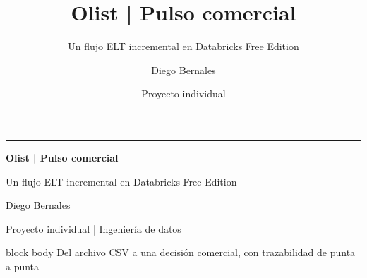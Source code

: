 \documentclass[aspectratio=169,10pt]{beamer}
\title{Olist | Pulso comercial}
\subtitle{Un flujo ELT incremental en Databricks Free Edition}
\author{Diego Bernales}
\date{Proyecto individual}
\begin{document}
\begingroup
{}
\begin{frame}[plain]
  \vspace*{1.1cm}
  \hspace*{1.2cm}\begin{minipage}{.78\textwidth}
    {\color{OlistTeal}\rule{1.4cm}{3pt}\par}
    \vspace{.4cm}
    {\color{OlistNavy}\LARGE\bfseries Olist | Pulso comercial\par}
    \vspace{.3cm}
    {\large Un flujo ELT incremental en Databricks Free Edition\par}
    \vspace{1.0cm}
    {\color{OlistGray}\large Diego Bernales\par}
    \vspace{.2cm}
    {\color{OlistGray}\small Proyecto individual | Ingeniería de datos\par}
    \vfill
    \begin{beamercolorbox}[rounded=true,sep=.65em,wd=\linewidth]{block body}
      \color{OlistTeal}\small Del archivo CSV a una decisión comercial, con trazabilidad de punta a punta
    \end{beamercolorbox}
  \end{minipage}
\end{frame}
\endgroup
\end{document}
